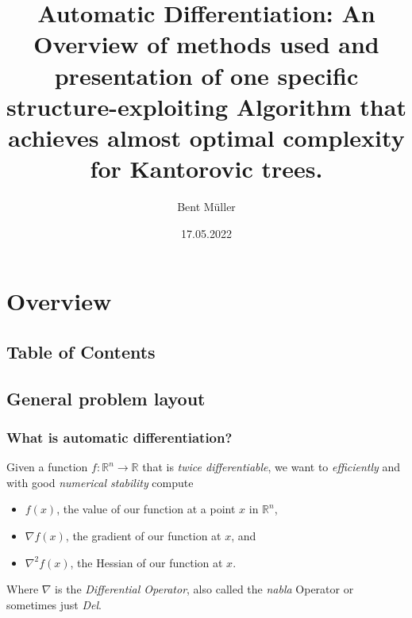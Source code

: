 \documentclass[compress]{beamer}
\title{
	Automatic Differentiation:
	An Overview of methods used and presentation of one
	specific structure-exploiting Algorithm that achieves
	almost optimal complexity for Kantorovic trees.
}
\author{Bent Müller}
\institute{University of Hamburg}
\date{17.05.2022}
\def\R{{\mathbb R}}
\begin{document}
\begin{frame}
	\titlepage
\end{frame}

\section{Overview}
\subsection{Table of Contents}
\begin{frame}
	\tableofcontents
\end{frame}

\subsection{General problem layout}

\begin{frame}
	\frametitle{What is automatic differentiation?}

	Given a function $f: \R^{n} \longrightarrow \R$ that is
	\textit{twice differentiable}, we want to
	\textit{efficiently}
	and with good \textit{numerical stability} compute
	\vspace{5mm}

	\begin{itemize}
		\item $f(x)$, the value of our function at a point $x$ in $\R^{n}$,
		\item $\nabla f(x)$, the gradient of our function at $x$, and
		\item $\nabla^2 f(x)$, the Hessian of our function at $x$.
	\end{itemize}

	\vspace{5mm}
	Where $\nabla$ is the \textit{Differential Operator}, also called
	the \textit{nabla} Operator or sometimes just \textit{Del}.
\end{frame}
\end{document}
